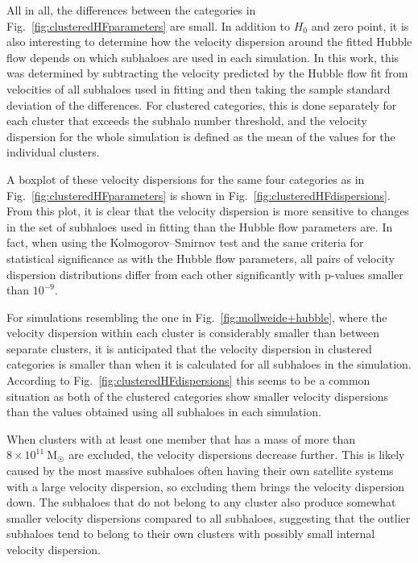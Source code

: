 \documentclass[english, twoside]{HYgradu}
\begin{document}
All in all, the differences between the categories in Fig.~\ref{fig:clusteredHFparameters} are small. In addition to $H_0$ and zero point, it is also interesting to determine how the velocity dispersion around the fitted Hubble flow depends on which subhaloes are used in each simulation. In this work, this was determined by subtracting the velocity predicted by the Hubble flow fit from velocities of all subhaloes used in fitting and then taking the sample standard deviation of the differences. For clustered categories, this is done separately for each cluster that exceeds the subhalo number threshold, and the velocity dispersion for the whole simulation is defined as the mean of the values for the individual clusters.

A boxplot of these velocity dispersions for the same four categories as in Fig.~\ref{fig:clusteredHFparameters} is shown in Fig.~\ref{fig:clusteredHFdispersions}. From this plot, it is clear that the velocity dispersion is more sensitive to changes in the set of subhaloes used in fitting than the Hubble flow parameters are. In fact, when using the Kolmogorov--Smirnov test and the same criteria for statistical significance as with the Hubble flow parameters, all pairs of velocity dispersion distributions differ from each other significantly with p-values smaller than $10^{-9}$.

For simulations resembling the one in Fig.~\ref{fig:mollweide+hubble}, where the velocity dispersion within each cluster is considerably smaller than between separate clusters, it is anticipated that the velocity dispersion in clustered categories is smaller than when it is calculated for all subhaloes in the simulation. According to Fig.~\ref{fig:clusteredHFdispersions} this seems to be a common situation as both of the clustered categories show smaller velocity dispersions than the values obtained using all subhaloes in each simulation.

When clusters with at least one member that has a mass of more than \mbox{$8 \times 10^{11}~\mathrm{M}_{\astrosun}$} are excluded, the velocity dispersions decrease further. This is likely caused by the most massive subhaloes often having their own satellite systems with a large velocity dispersion, so excluding them brings the velocity dispersion down. The subhaloes that do not belong to any cluster also produce somewhat smaller velocity dispersions compared to all subhaloes, suggesting that the outlier subhaloes tend to belong to their own clusters with possibly small internal velocity dispersion.
\end{document}
